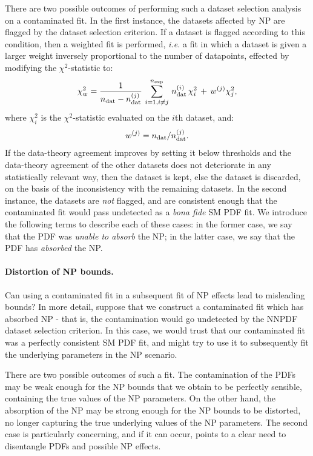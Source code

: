 \documentclass[withindex,glossary]{cam-thesis}
\begin{document}
There are two possible outcomes of performing such a dataset selection analysis on a contaminated fit. In the first instance, the datasets affected by NP are flagged by the dataset selection criterion. 
%
If a dataset is flagged according to this condition, then a weighted fit is performed, 
{\it i.e.} a fit in which a dataset is given a
larger weight inversely proportional to the number of datapoints,
effected by modifying the $\chi^2$-statistic to:
\begin{equation}
\chi^2_w=\frac{1}{n_{\rm dat}-n_{\rm
    dat}^{(j)}}\,\sum_{i=1,i\neq j}^{n_{\rm exp}} \,n_{\rm
  dat}^{(i)}\,\chi^2_i \, + \,w^{(j)}\chi^2_j,
  \end{equation}
where $\chi^2_i$ is the $\chi^2$-statistic evaluated on the $i$th dataset, and:
  \begin{equation}
    \label{eq:wgts}
    w^{(j)} = n_{\rm dat}/n_{\rm dat}^{(j)}.
    \end{equation}
If the data-theory agreement improves by setting it below thresholds and the
data-theory agreement of the other datasets does not deteriorate in
any statistically relevant way, then the dataset is kept, else the dataset is discarded, 
on the basis of the inconsistency with the remaining datasets.
%
In the second instance, the datasets are \textit{not} flagged, and are consistent enough that the contaminated fit 
would pass undetected as a \textit{bona fide} SM PDF fit. We introduce the following terms to describe each of these cases: 
in the former case, we say that the PDF was \textit{unable to absorb} the NP; in the latter case, we say that the PDF has \textit{absorbed} the NP.

\paragraph{Distortion of NP bounds.} Can using a contaminated fit in a subsequent fit of NP effects lead to misleading bounds? In more detail, suppose that we construct a contaminated fit which has absorbed NP - that is, the contamination would go undetected by the NNPDF dataset selection criterion. In this case, we would trust that our contaminated fit was a perfectly consistent SM PDF fit, and might try to use it to subsequently fit the underlying parameters in the NP scenario. 

There are two possible outcomes of such a fit. The contamination of the PDFs may be weak enough for the NP bounds that we obtain to be perfectly sensible, containing the true values of the NP parameters. On the other hand, the absorption of the NP may be strong enough for the NP bounds to be distorted, no longer capturing the true underlying values of the NP parameters. The second case is particularly concerning, and if it can occur, points to a clear need to disentangle PDFs and possible NP effects.
\end{document}
